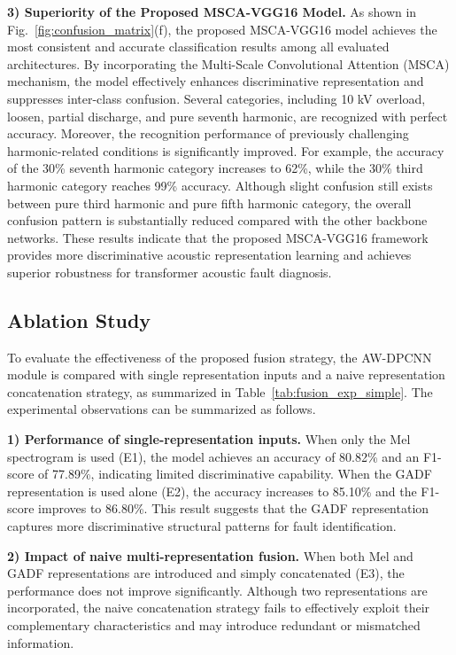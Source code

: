 \documentclass[journal]{IEEEtran}
\begin{document}
\textbf{3) Superiority of the Proposed MSCA-VGG16 Model.}
As shown in Fig.~\ref{fig:confusion_matrix}(f), the proposed MSCA-VGG16 model achieves the most consistent and accurate classification results among all evaluated architectures. By incorporating the Multi-Scale Convolutional Attention (MSCA) mechanism, the model effectively enhances discriminative representation and suppresses inter-class confusion. Several categories, including 10 kV overload, loosen, partial discharge, and pure seventh harmonic, are recognized with perfect accuracy. Moreover, the recognition performance of previously challenging harmonic-related conditions is significantly improved. For example, the accuracy of the 30\% seventh harmonic category increases to 62\%, while the 30\% third harmonic category reaches 99\% accuracy. Although slight confusion still exists between pure third harmonic and pure fifth harmonic category, the overall confusion pattern is substantially reduced compared with the other backbone networks. These results indicate that the proposed MSCA-VGG16 framework provides more discriminative acoustic representation learning and achieves superior robustness for transformer acoustic fault diagnosis.

\subsection{Ablation Study} 	
To evaluate the effectiveness of the proposed fusion strategy, the AW-DPCNN module is compared with single representation inputs and a naive representation concatenation strategy, as summarized in Table~\ref{tab:fusion_exp_simple}. The experimental observations can be summarized as follows.

\textbf{1) Performance of single-representation inputs.}
When only the Mel spectrogram is used (E1), the model achieves an accuracy of 80.82\% and an F1-score of 77.89\%, indicating limited discriminative capability. When the GADF representation is used alone (E2), the accuracy increases to 85.10\% and the F1-score improves to 86.80\%. This result suggests that the GADF representation captures more discriminative structural patterns for fault identification.

\textbf{2) Impact of naive multi-representation fusion.}
When both Mel and GADF representations are introduced and simply concatenated (E3), the performance does not improve significantly. Although two representations are incorporated, the naive concatenation strategy fails to effectively exploit their complementary characteristics and may introduce redundant or mismatched information.
\end{document}
